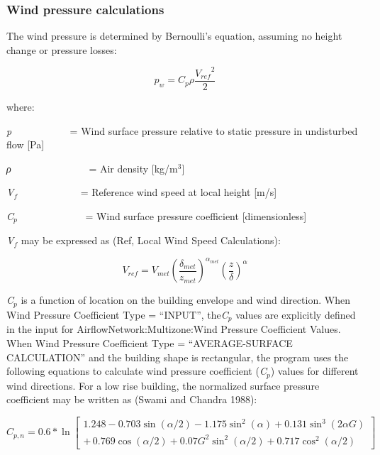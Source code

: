 \subsubsection{Wind pressure calculations}\label{wind-pressure-calculations}

The wind pressure is determined by Bernoulli's equation, assuming no height change or pressure losses:

\begin{equation}
{p_w} = {C_p}\rho \frac{{{V_{ref}}^2}}{2}
\end{equation}

where:

\emph{p\(_{ }\)}~~~~~~~~~~~ = Wind surface pressure relative to static pressure in undisturbed flow {[}Pa{]}

\emph{ρ}~~~~~~~~~~~~~~~ = Air density {[}kg/m\(^{3}\){]}

\emph{V\(_{f}\)}~~~~~~~~~~~~ = Reference wind speed at local height {[}m/s{]}

\emph{C\(_{p}\)}~~~~~~~~~~~~~ = Wind surface pressure coefficient {[}dimensionless{]}

\emph{V\(_{f}\)} may be expressed as (Ref, Local Wind Speed Calculations):

\begin{equation}
{V_{ref}} = {V_{met}}{\left( {\frac{{{\delta_{met}}}}{{{z_{met}}}}} \right)^{{\alpha_{met}}}}{\left( {\frac{z}{\delta }} \right)^\alpha }
\end{equation}

\emph{C\(_{p}\)} is a function of location on the building envelope and wind direction. When Wind Pressure Coefficient Type = ``INPUT'', the\emph{C\(_{p}\)} values are explicitly defined in the input for AirflowNetwork:Multizone:Wind Pressure Coefficient Values. When Wind Pressure Coefficient Type = ``AVERAGE-SURFACE CALCULATION'' and the building shape is rectangular, the program uses the following equations to calculate wind pressure coefficient (\emph{C\(_{p}\)}) values for different wind directions. For a low rise building, the normalized surface pressure coefficient may be written as (Swami and Chandra 1988):

\begin{equation}
{C_{p,n}} = 0.6*\ln \left[ \begin{array}{l}1.248 - 0.703\sin (\alpha /2) - 1.175{\sin ^2}(\alpha ) + 0.131{\sin ^3}(2\alpha G)\\ + \,0.769\cos (\alpha /2) + 0.07{G^2}{\sin ^2}(\alpha /2) + 0.717{\cos ^2}(\alpha /2)\end{array} \right]
\end{equation}

